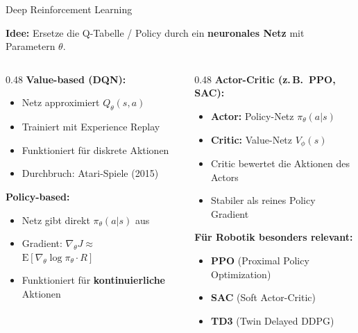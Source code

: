 \documentclass[%
  aspectratio=169,
  10pt
]{beamer}
\newcommand{\hl}[1]{{\color{fbblau}\textbf{#1}}}
\begin{document}
\begin{frame}{Deep Reinforcement Learning}

\textbf{Idee:} Ersetze die Q-Tabelle / Policy durch ein
\hl{neuronales Netz} mit Parametern $\theta$.

\vspace{3mm}
\begin{columns}[T]
  \begin{column}{0.48\textwidth}
    \textbf{Value-based (DQN):}
    \begin{itemize}
      \item Netz approximiert $Q_\theta(s,a)$
      \item Trainiert mit Experience Replay
      \item Funktioniert für diskrete Aktionen
      \item Durchbruch: Atari-Spiele (2015)
    \end{itemize}

    \vspace{2mm}
    \textbf{Policy-based:}
    \begin{itemize}
      \item Netz gibt direkt $\pi_\theta(a|s)$ aus
      \item Gradient: $\nabla_\theta J \approx$\\
            $\mathrm{E}[\nabla_\theta \log\pi_\theta \cdot R]$
      \item Funktioniert für \hl{kontinuierliche} Aktionen
    \end{itemize}
  \end{column}
  \begin{column}{0.48\textwidth}
    \textbf{Actor-Critic (z.\,B.\ PPO, SAC):}
    \begin{itemize}
      \item \textbf{Actor:} Policy-Netz $\pi_\theta(a|s)$
      \item \textbf{Critic:} Value-Netz $V_\phi(s)$
      \item Critic bewertet die Aktionen des Actors
      \item Stabiler als reines Policy Gradient
    \end{itemize}

    \vspace{2mm}
    \textbf{Für Robotik besonders relevant:}
    \begin{itemize}
      \item \textbf{PPO} (Proximal Policy Optimization)
      \item \textbf{SAC} (Soft Actor-Critic)
      \item \textbf{TD3} (Twin Delayed DDPG)
    \end{itemize}
  \end{column}
\end{columns}

\end{frame}
\end{document}
